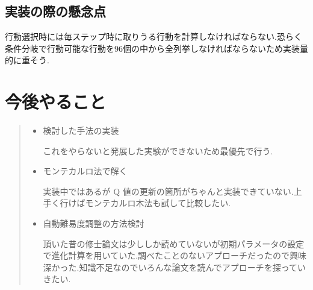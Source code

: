 \documentclass{jarticle}     %
\begin{document}
\subsection{実装の際の懸念点}
行動選択時には毎ステップ時に取りうる行動を計算しなければならない.恐らく条件分岐で行動可能な行動を96個の中から全列挙しなければならないため実装量的に重そう.

\section{今後やること}


\begin{quote}
  \begin{itemize}
   \item 検討した手法の実装
   \par
    これをやらないと発展した実験ができないため最優先で行う.
    \item モンテカルロ法で解く
    \par
    実装中ではあるが Q 値の更新の箇所がちゃんと実装できていない.上手く行けばモンテカルロ木法も試して比較したい.
    \item 自動難易度調整の方法検討
    \par
    頂いた昔の修士論文は少ししか読めていないが初期パラメータの設定で進化計算を用いていた.調べたことのないアプローチだったので興味深かった.知識不足なのでいろんな論文を読んでアプローチを探っていきたい.

  \end{itemize}
 \end{quote}



%
%
\end{document}
